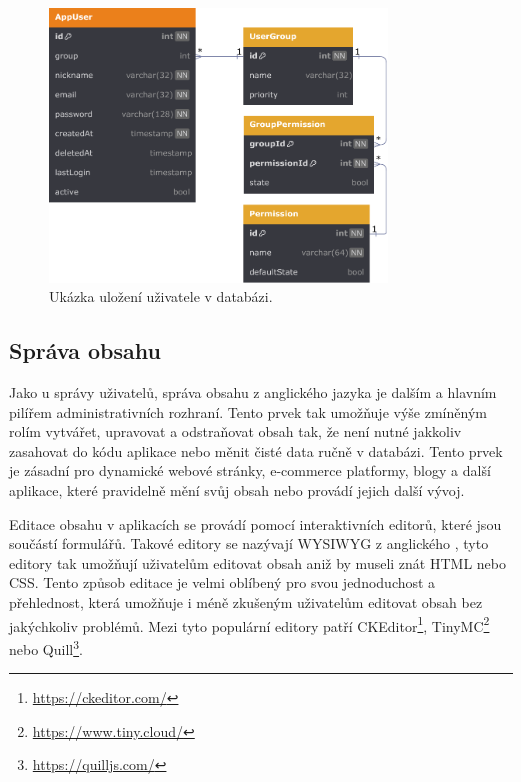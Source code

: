 \begin{figure}[H]
    \centering
    \includegraphics[width=0.8\textwidth]{figures/userManagement}
    \caption{Ukázka uložení uživatele v databázi. \cite{responsive_design}}
    \label{fig:user-management}
\end{figure}

\subsection{Správa obsahu}
\label{subsec:admin-elements-content-management}
Jako u správy uživatelů, správa obsahu z anglického jazyka \textit{} je dalším a hlavním pilířem administrativních rozhraní. Tento prvek tak umožňuje výše zmíněným rolím vytvářet, upravovat a odstraňovat obsah tak, že není nutné jakkoliv zasahovat do kódu aplikace nebo měnit čisté data ručně v databázi. Tento prvek je zásadní pro dynamické webové stránky, e-commerce platformy, blogy a další aplikace, které pravidelně mění svůj obsah nebo provádí jejich další vývoj.

Editace obsahu v aplikacích se provádí pomocí interaktivních editorů, které jsou součástí formulářů. Takové editory se nazývají WYSIWYG z anglického \textit{}, tyto editory tak umožňují uživatelům editovat obsah aniž by museli znát HTML nebo CSS. Tento způsob editace je velmi oblíbený pro svou jednoduchost a přehlednost, která umožňuje i méně zkušeným uživatelům editovat obsah bez jakýchkoliv problémů. Mezi tyto populární editory patří CKEditor\footnote[1]{\url{https://ckeditor.com/}}, TinyMC\footnote[2]{\url{https://www.tiny.cloud/}} nebo Quill\footnote[3]{\url{https://quilljs.com/}}.

